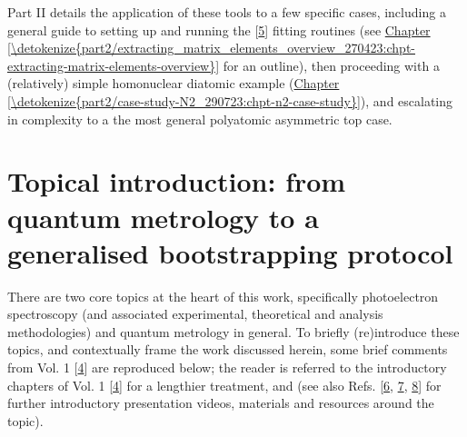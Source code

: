 \documentclass[letterpaper,table,10pt,english]{jupyterBook}
\begin{document}
\sphinxAtStartPar
Part II details the application of these tools to a few specific cases, including a general guide to setting up and running the  {[}\hyperlink{cite.backmatter/bibliography:id682}{5}{]} fitting routines (see \hyperref[\detokenize{part2/extracting_matrix_elements_overview_270423:chpt-extracting-matrix-elements-overview}]{Chapter \ref{\detokenize{part2/extracting_matrix_elements_overview_270423:chpt-extracting-matrix-elements-overview}}} for an outline), then proceeding with a (relatively) simple homonuclear diatomic example (\hyperref[\detokenize{part2/case-study-N2_290723:chpt-n2-case-study}]{Chapter \ref{\detokenize{part2/case-study-N2_290723:chpt-n2-case-study}}}), and escalating in complexity to a the most general polyatomic asymmetric top case.


\section{Topical introduction: from quantum metrology to a generalised bootstrapping protocol}
\label{\detokenize{part1/main_intro_060723:topical-introduction-from-quantum-metrology-to-a-generalised-bootstrapping-protocol}}\label{\detokenize{part1/main_intro_060723:sec-topical-intro}}
\sphinxAtStartPar
There are two core topics at the heart of this work, specifically photoelectron spectroscopy (and associated experimental, theoretical and analysis methodologies) and quantum metrology in general. To briefly (re)introduce these topics, and contextually frame the work discussed herein, some brief comments from  Vol. 1 {[}\hyperlink{cite.backmatter/bibliography:id677}{4}{]} are reproduced below; the reader is referred to the introductory chapters of  Vol. 1 {[}\hyperlink{cite.backmatter/bibliography:id677}{4}{]} for a lengthier treatment, and  (see also Refs. {[}\hyperlink{cite.backmatter/bibliography:id674}{6}, \hyperlink{cite.backmatter/bibliography:id676}{7}, \hyperlink{cite.backmatter/bibliography:id670}{8}{]} for further introductory presentation videos, materials and resources around the topic).
\end{document}
